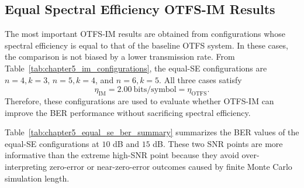 
\subsection{Equal Spectral Efficiency OTFS-IM Results}

The most important OTFS-IM results are obtained from configurations whose spectral efficiency is equal to that of the baseline OTFS system. In these cases, the comparison is not biased by a lower transmission rate. From Table~\ref{tab:chapter5_im_configurations}, the equal-SE configurations are \(n=4,k=3\), \(n=5,k=4\), and \(n=6,k=5\). All three cases satisfy
\begin{equation}
    \eta_{\mathrm{IM}} = 2.00~\mathrm{bits/symbol}
    =
    \eta_{\mathrm{OTFS}}.
    \label{eq:chapter5_equal_se_condition}
\end{equation}
Therefore, these configurations are used to evaluate whether OTFS-IM can improve the BER performance without sacrificing spectral efficiency.

Table~\ref{tab:chapter5_equal_se_ber_summary} summarizes the BER values of the equal-SE configurations at \(10\) dB and \(15\) dB. These two SNR points are more informative than the extreme high-SNR point because they avoid over-interpreting zero-error or near-zero-error outcomes caused by finite Monte Carlo simulation length.

